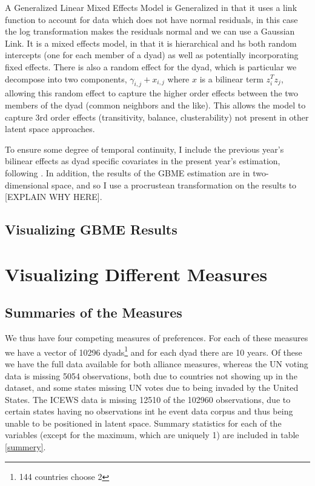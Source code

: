 \documentclass[12pt,onesided,fullpage]{amsart}
\begin{document}
A Generalized Linear Mixed Effects Model is Generalized in that it uses a link function to account for data which does not have normal residuals, in this case the log transformation makes the residuals normal and we can use a Gaussian Link. It is a mixed effects model, in that it is hierarchical and hs both random intercepts (one for each member of a dyad) as well as potentially incorporating fixed effects. There is also a random effect for the dyad, which is particular we decompose into two components, $\gamma_{i,j} + x_{i,j}$ where $x$ is a bilinear term $z_i^Tz_j$, allowing this random effect to capture the higher order effects between the two members of the dyad (common neighbors and the like). This allows the model to capture 3rd order effects (transitivity,  balance, clusterability) not present in other latent space approaches.

To ensure some degree of temporal continuity, I include the previous year's bilinear effects as dyad specific covariates in the present year's estimation, following \citep{ward:ahlquist:rozenas:2013}. In addition, the results of the GBME estimation are in two-dimensional space, and so I use a procrustean transformation on the results to [EXPLAIN WHY HERE].

\subsection{Visualizing GBME Results}

\section{Visualizing Different Measures}
\subsection{Summaries of the Measures}
We thus have four competing measures of preferences. For each of these measures we have a vector of 10296 dyads\footnote{144 countries choose 2} and for each dyad there are 10 years. Of these we have the full data available for both alliance measures, whereas the UN voting data is missing 5054 observations, both due to countries not showing up in the dataset, and some states missing UN votes due to being invaded by the United States. The ICEWS data is missing 12510 of the 102960 observations, due to certain states having no observations int he event data corpus and thus being unable to be positioned in latent space. Summary statistics for each of the variables (except for the maximum, which are uniquely 1) are included in table \ref{summery}.
\end{document}
